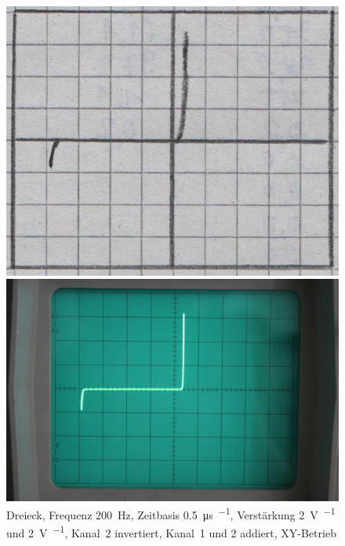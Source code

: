 \begin{figure}[htbp]
	\centering
	\begin{minipage}{.45\linewidth}
	\includegraphics[width=\linewidth]{Oszi_Hand/788.jpg}
	\end{minipage}
	\hfill
	\begin{minipage}{.45\linewidth}
	\includegraphics[width=\linewidth]{Oszi_Foto/788.jpg}
	\end{minipage}
	\caption{%
		Dreieck, Frequenz \SI{200}{\hertz},
		Zeitbasis \SI{.5}{\micro\second\per\division},
		Verstärkung \SI{2}{\volt\per\division} und \SI{2}{\volt\per\division},
		Kanal~2 invertiert, Kanal~1 und 2 addiert, XY-Betrieb
	}
	\label{fig:788}
\end{figure}

